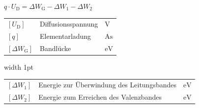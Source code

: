 \vspace{0.1cm}

$
\boxed{
q \cdot U_\text{D} = \Delta W_\text{G} - \Delta W_1 - \Delta W_2
}
$

\vspace{0.1cm}

\begin{minipage}[t]{0.43\columnwidth}
    \renewcommand{\arraystretch}{1.2}
    \begin{tabular}{@{} l p{2.6cm} l @{}}
        $[U_\text{D}]$       & Diffusionsspannung \dotfill                         & $\mathrm{V}$ \\
        $[q]$                & Elementarladung \dotfill                            & $\mathrm{As}$ \\
        $[\Delta W_\text{G}]$ & Bandlücke \dotfill & $\mathrm{eV}$ \\
    \end{tabular}
\end{minipage}
\hfill
\vrule width 1pt
\hfill
\begin{minipage}[t]{0.52\columnwidth}
    \renewcommand{\arraystretch}{1.2}
    \begin{tabular}{@{} l p{3.1cm} l @{}}
        $[\Delta W_1]$       & Energie zur Überwindung des Leitungsbandes \dotfill & $\mathrm{eV}$ \\
        $[\Delta W_2]$       & Energie zum Erreichen des Valenzbandes \dotfill     & $\mathrm{eV}$ \\ 
    \end{tabular}
\end{minipage}

